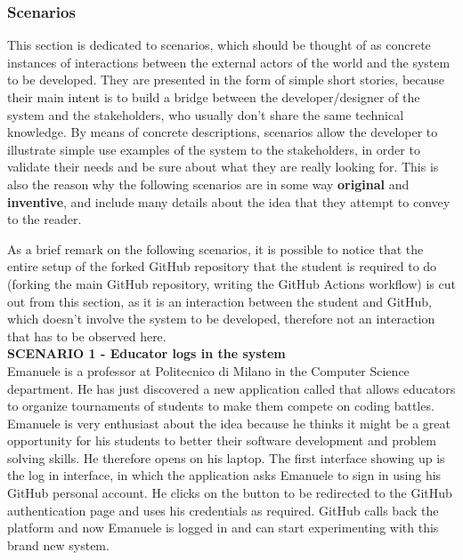 \subsubsection{Scenarios}
This section is dedicated to scenarios, which should be thought of as concrete instances of interactions between the external actors of the world and the system to be developed.
They are presented in the form of simple short stories, because their main intent is to build a bridge between the developer/designer of the system and the stakeholders, who usually don't share the same technical knowledge. By means of concrete descriptions, scenarios allow the developer to illustrate simple use examples of the system to the stakeholders, in order to validate their needs and be sure about what they are really looking for. 
This is also the reason why the following scenarios are in some way \textbf{original} and \textbf{inventive}, and include many details about the idea that they attempt to convey to the reader.

As a brief remark on the following scenarios, it is possible to notice that the entire setup of the forked GitHub repository that the student is required to do (forking the main GitHub repository, writing the GitHub Actions workflow) is cut out from this section, as it is an interaction between the student and GitHub, which doesn't involve the system to be developed, therefore not an interaction that has to be observed here.\\

\textbf{SCENARIO 1 - Educator logs in the system} \\
    Emanuele is a professor at Politecnico di Milano in the Computer Science department. He has just discovered a new application called \app that allows educators to organize tournaments of students to make them compete on coding battles.\\
    Emanuele is very enthusiast about the idea because he thinks it might be a great opportunity for his students to better their software development and problem solving skills. He therefore opens \app on his laptop. The first interface showing up is the log in interface, in which the application asks Emanuele to sign in using his GitHub personal account. He clicks on the button to be redirected to the GitHub authentication page and uses his credentials as required. GitHub calls back the \app platform and now Emanuele is logged in and can start experimenting with this brand new system.\\
    
